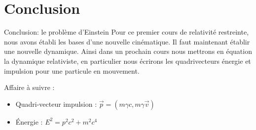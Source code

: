 \documentclass{beamer}
\begin{document}
\section{Conclusion}
\begin{frame}{Conclusion: le problème d'Einstein}
    Pour ce premier cours de relativité restreinte, nous avons établi les bases d’une nouvelle cinématique. Il faut
    maintenant établir une nouvelle dynamique. Ainsi dans un prochain cours nous mettrons en équation la dynamique
    relativiste, en particulier nous écrirons les quadrivecteurs énergie et impulsion pour une particule en mouvement.

    Affaire à suivre : 
    \begin{itemize}
        \item Quadri-vecteur impulsion : $\vec{p} = (m\gamma c, m\gamma \vec{v})$
        \item Énergie : $E^2=p^2c^2+m^2c^4$
    \end{itemize}
\end{frame} 
\end{document}
